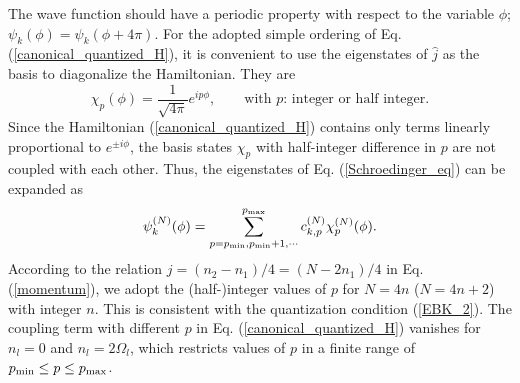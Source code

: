 \documentclass[%
superscriptaddress,
preprint,
showpacs,
nofootinbib,
amsmath,amssymb,
prc,
floatfix ]%
{revtex4-1}
\begin{document}
The wave function should have a periodic property with respect to
the variable $\phi$;
$\psi_k(\phi)=\psi_k(\phi+4\pi)$.
For the adopted simple ordering of Eq. (\ref{canonical_quantized_H}),
it is convenient to use the eigenstates of $\hat{j}$ as the basis
to diagonalize the Hamiltonian.
They are
\begin{equation}
	\chi_p(\phi) = \frac{1}{\sqrt{4\pi}} e^{ip\phi} ,
	\quad\quad\mbox{with $p$: integer or half integer} .
\end{equation}
Since the Hamiltonian (\ref{canonical_quantized_H}) contains only
terms linearly proportional to $e^{\pm i\phi}$,
the basis states $\chi_p$ with half-integer difference in $p$
are not coupled with each other.
Thus, the eigenstates of Eq. (\ref{Schroedinger_eq}) can be expanded as
\begin{equation}
	\psi_k^{(N)}(\phi) = 
	\sum_{p=p_{\rm min},p_{\rm min}+1,\cdots}^{p_{\rm max}}
	c_{k,p}^{(N)} \chi_p^{(N)}(\phi) .
	\label{CQ_eigenstate}
\end{equation}
According to the relation $j=(n_2-n_1)/4=(N-2n_1)/4$ in Eq. (\ref{momentum}),
we adopt the (half-)integer values of $p$ for $N=4n$ ($N=4n+2$)
with integer $n$.
This is consistent with the quantization condition (\ref{EBK_2}).
The coupling term with different $p$
in Eq. (\ref{canonical_quantized_H}) vanishes
for $n_l=0$ and $n_l=2\Omega_l$,
which restricts values of $p$ in a finite range of
$p_{\rm min}\leq p \leq p_{\rm max}$.
\end{document}
